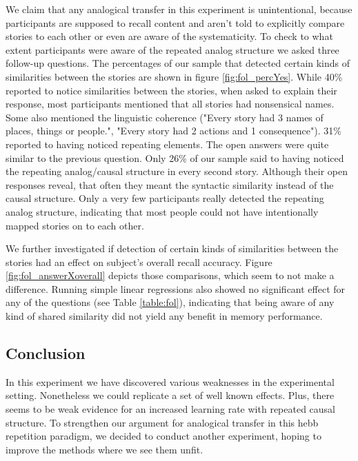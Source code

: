 \documentclass[a4paper,man,natbib,floatsintext,import]{apa6}
\begin{document}
We claim that any analogical transfer in this experiment is unintentional, because participants are supposed to recall content and aren't told to explicitly compare stories to each other or even are aware of the systematicity. To check to what extent participants were aware of the repeated analog structure we asked three follow-up questions. The percentages of our sample that detected certain kinds of similarities between the stories are shown in figure \ref{fig:fol_percYes}. While 40\% reported to notice similarities between the stories, when asked to explain their response, most participants mentioned that all stories had nonsensical names. Some also mentioned the linguistic coherence ("Every story had 3 names of places, things or people.", "Every story had 2 actions and 1 consequence"). 31\% reported to having noticed repeating elements. The open answers were quite similar to the previous question. Only 26\% of our sample said to having noticed the repeating analog/causal structure in every second story. Although their open responses reveal, that often they meant the syntactic similarity instead of the causal structure. Only a very few participants really detected the repeating analog structure, indicating that most people could not have intentionally mapped stories on to each other.

We further investigated if detection of certain kinds of similarities between the stories had an effect on subject's overall recall accuracy. Figure \ref{fig:fol_answerXoverall} depicts those comparisons, which seem to not make a difference. Running simple linear regressions also showed no significant effect for any of the questions (see Table \ref{table:fol}), indicating that being aware of any kind of shared similarity did not yield any benefit in memory performance.



\subsection{Conclusion}
In this experiment we have discovered various weaknesses in the experimental setting. Nonetheless we could replicate a set of well known effects. Plus, there seems to be weak evidence for an increased learning rate with repeated causal structure. To strengthen our argument for analogical transfer in this hebb repetition paradigm, we decided to conduct another experiment, hoping to improve the methods where we see them unfit.

\newpage
\end{document}
